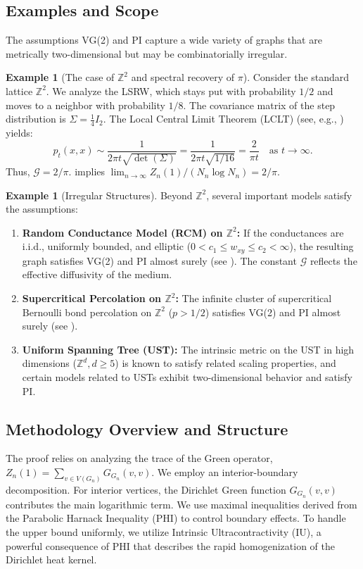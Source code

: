 \documentclass[12pt]{amsart}
\theoremstyle{definition}
\newtheorem{example}[theorem]{Example}
\theoremstyle{remark}
\newcommand{\cG}{\mathcal{G}}    %
\begin{document}
\subsection{Examples and Scope}
The assumptions VG(2) and PI capture a wide variety of graphs that are metrically two-dimensional but may be combinatorially irregular.

\begin{example}[The case of $\mathbb{Z}^2$ and spectral recovery of $\pi$]\label{rem:pi2}
Consider the standard lattice $\mathbb{Z}^2$. We analyze the LSRW, which stays put with probability $1/2$ and moves to a neighbor with probability $1/8$. The covariance matrix of the step distribution is $\Sigma = \frac{1}{4} I_2$. The Local Central Limit Theorem (LCLT) (see, e.g., \cite[Ch. 2]{LawlerLimic10}) yields:
\[
p_t(x,x) \sim \frac{1}{2\pi t \sqrt{\det(\Sigma)}} = \frac{1}{2\pi t \sqrt{1/16}} = \frac{2}{\pi t} \quad \text{as } t \to \infty.
\]
Thus, $\cG = 2/\pi$.  implies $\lim_{n \to \infty} Z_n(1) / (N_n \log N_n) = 2/\pi$.
\end{example}

\begin{example}[Irregular Structures]\label{ex:irregular}
Beyond $\mathbb{Z}^2$, several important models satisfy the assumptions:
\begin{enumerate}
    \item \textbf{Random Conductance Model (RCM) on $\mathbb{Z}^2$:} If the conductances are i.i.d., uniformly bounded, and elliptic ($0 < c_1 \leq w_{xy} \leq c_2 < \infty$), the resulting graph satisfies VG(2) and PI almost surely (see \cite{Biskup11}). The constant $\cG$ reflects the effective diffusivity of the medium.
    \item \textbf{Supercritical Percolation on $\mathbb{Z}^2$:} The infinite cluster of supercritical Bernoulli bond percolation on $\mathbb{Z}^2$ ($p>1/2$) satisfies VG(2) and PI almost surely (see \cite{Barlow04}).
    \item \textbf{Uniform Spanning Tree (UST):} The intrinsic metric on the UST in high dimensions ($\mathbb{Z}^d, d\geq 5$) is known to satisfy related scaling properties, and certain models related to USTs exhibit two-dimensional behavior and satisfy PI.
\end{enumerate}
\end{example}

\subsection{Methodology Overview and Structure}
The proof relies on analyzing the trace of the Green operator, $Z_n(1) = \sum_{v \in V(G_n)} G_{G_n}(v,v)$. We employ an interior-boundary decomposition. For interior vertices, the Dirichlet Green function $G_{G_n}(v,v)$ contributes the main logarithmic term. We use maximal inequalities derived from the Parabolic Harnack Inequality (PHI) to control boundary effects. To handle the upper bound uniformly, we utilize Intrinsic Ultracontractivity (IU), a powerful consequence of PHI that describes the rapid homogenization of the Dirichlet heat kernel.
\end{document}
